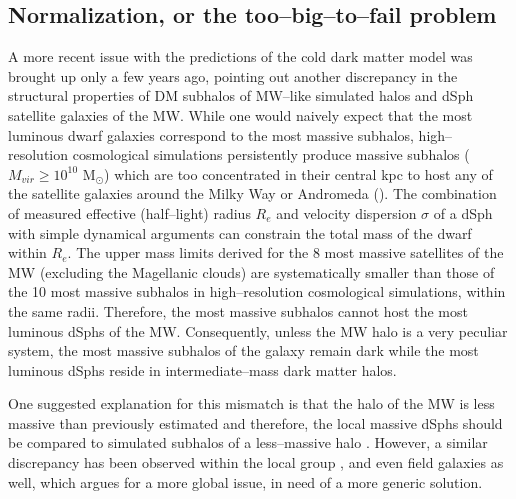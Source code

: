 \documentclass[a4wide,12pt]{book}
\newcommand{\msun }{$\mathrm{M}_{\odot}$}
\begin{document}
{\subsection{Normalization, or the too--big--to--fail problem}
\label{subsec:too-big-to-fail}
A more recent issue with the predictions of the cold dark matter model was brought up only a few years ago, pointing out another discrepancy in the structural properties of DM subhalos of MW--like simulated halos and dSph satellite galaxies of the MW. While one would naively expect that the most luminous dwarf galaxies correspond to the most massive subhalos, high--resolution cosmological simulations persistently produce massive subhalos ($M_{vir} \geq 10^{10} $ \msun ) which are too concentrated in their central kpc to host any of the satellite galaxies around the Milky Way or Andromeda (\cite{Boylan-Kolchin+2011, Boylan--Kolchin+2012}). The combination of measured effective (half--light) radius $R_e$ and velocity dispersion $\sigma$ of a dSph with simple dynamical arguments can constrain the total mass of the dwarf within $R_e$. The upper mass limits derived for the 8 most massive satellites of the MW (excluding the Magellanic clouds) are systematically smaller than those of the 10 most massive subhalos in high--resolution cosmological simulations, within the same radii. Therefore, the most massive subhalos cannot host the most luminous dSphs of the MW. Consequently, unless the MW halo is a very peculiar system, the most massive subhalos of the galaxy remain dark while the most luminous dSphs reside in intermediate--mass dark matter halos. 

One suggested explanation for this mismatch is that the halo of the MW is less massive than previously estimated and therefore, the local massive dSphs should be compared to simulated subhalos of a less--massive halo \citep[][]{Boylan--Kolchin+2012, Wang+2012, Vera--Ciro+2013}. However, a similar discrepancy has been observed within the local group \citep[][]{Kirby+2014, Garrison--Kimmel+2014, Tollerud+2014}, and even field galaxies \citep[][]{Papastergis+2015} as well, which argues for a more global issue, in need of a more generic solution. 

}
\end{document}

